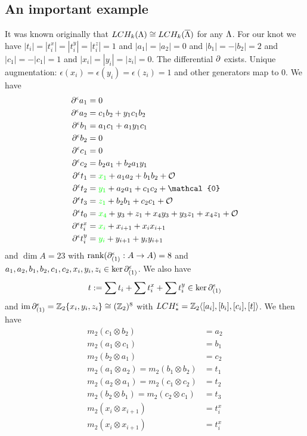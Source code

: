 \documentclass[11pt,oneside]{amsart}
\begin{document}
\subsection{An important example}
It was known originally that $\\LCH_k(\Lambda)\cong \\LCH_k(\overline{\Lambda})$ for any $\Lambda$. For our knot we have $|t_i|=|t_i^x|=|t_i^y|=|t_i^z|=1$ and $|a_1|=|a_2|=0$ and $|b_1|=-|b_2|=2$ and $|c_1|=-|c_1|=1$ and $|x_i|=|y_i|=|z_i|=0$. The differential $\partial$ exists. Unique augmentation: $\epsilon(x_i)=\epsilon(y_i)=\epsilon(z_i)=1$ and other generators  map to $0$.
We have
\begin{align*}
    \d^\epsilon a_1&=0\\
    \d^\epsilon a_2&=c_1b_2+y_1c_1b_2\\
    \d^\epsilon b_1&=a_1c_1+a_1y_1c_1\\
    \d^\epsilon b_2&=0\\
    \d^\epsilon c_1&=0\\
    \d^\epsilon c_2&=b_2a_1+b_2a_1y_1 \\
    \d^\epsilon t_1&={\color{green}x_1}+a_1a_2+b_1b_2+\mathcal{O}\\
    \d^\epsilon t_2&={\color{green}y_1}+a_2a_1+c_1c_2+ \mathcal{0}\\
    \d^\epsilon t_3&={\color{green}z_1}+b_2b_1+c_2c_1+\mathcal{O}\\
    \d^\epsilon t_0&={\color{green}x_4}+y_3+z_1+x_4y_3+y_3z_1+x_4z_1+\mathcal{O}\\
    \d^\epsilon t_i^x&={\color{green}x_i}+x_{i+1}+x_ix_{i+1}\\
    \d^\epsilon t_i^y&={\color{green}y_i}+y_{i+1}+y_i y_{i+1}\\
\end{align*}
and $\dim A=23$ with $\text{rank}(\partial_{(1)}^\epsilon: A\rightarrow A)=8$ and $a_1,a_2,b_1,b_2,c_1,c_2,x_i,y_i,z_i\in \ker{\partial_{(1)}^\epsilon}$. We also have
    \[t:=\sum t_i + \sum t_i^x + \sum t_i^y\in \ker \partial_{(1)}^\epsilon\]
and $\operatorname{im} \partial_{(1)}^\epsilon=\mathbb Z_2\{x_i,y_i,z_i\}\cong (\mathbb Z_2)^8$
with $\\LCH_{\ast}^\epsilon=\mathbb Z_2\langle[a_i],[b_i],[c_i],[t]\rangle$.
We then have
    \begin{align*}
        m_2(c_1\otimes b_2)&=a_2\\
        m_2(a_1\otimes c_1)&=b_1\\
        m_2(b_2\otimes a_1)&=c_2\\
        m_2(a_1\otimes a_2)=m_2(b_1\otimes b_2)&=t_1\\
        m_2(a_2\otimes a_1)=m_2(c_1\otimes c_2)&=t_2\\
        m_2(b_2\otimes b_1)=m_2(c_2\otimes c_1)&=t_3\\
        m_2(x_i\otimes x_{i+1})&=t_i^x\\
        m_2(x_i\otimes x_{i+1})&=t_i^x\\
    \end{align*}
\end{document}

